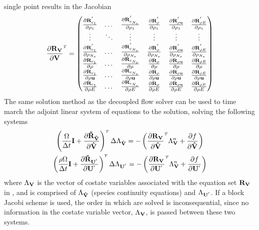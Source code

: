 single point results in the Jacobian
\begin{gather}
  \drvdv = 
  \begin{pmatrix}
    \tpdiff{\rho_1}{c_1}      & \dots  & \tpdiff{\rho_1}{c_{N_s}}     & \tpdiff{\rho_1}{\rho}     & \tpdiff{\rho_1}{\rho \vu}     &  \tpdiff{\rho_1}{\rho E}  \\
    \vdots                    & \ddots & \vdots                       & \vdots                    & \vdots                        & \vdots                    \\
    \tpdiff{\rho_{N_s}}{c_1}  & \dots  & \tpdiff{\rho_{N_s}}{c_{N_s}} & \tpdiff{\rho_{N_s}}{\rho} & \tpdiff{\rho_{N_s}}{\rho \vu} &  \tpdiff{\rho_{N_s}}{\rho E}    \\
    \tdiff{\rho}{c_1}         & \dots  & \tdiff{\rho}{c_{N_s}}        & \tdiff{\rho}{\rho}        & \tdiff{\rho}{\rho \vu}        &  \tdiff{\rho}{\rho E}     \\
    \tdiff{\rho \vu}{c_1}     & \dots  & \tdiff{\rho \vu}{c_{N_s}}    & \tdiff{\rho \vu}{\rho}    & \tdiff{\rho \vu}{\rho \vu}    &  \tdiff{\rho \vu}{\rho E} \\
    \tdiff{\rho E}{c_1}       & \dots  & \tdiff{\rho E}{c_{N_s}}      & \tdiff{\rho E}{\rho}      & \tdiff{\rho E}{\rho \vu}      &  \tdiff{\rho E}{\rho E}
  \end{pmatrix}
  \label{dc-full-system}
\end{gather}
The same solution method as the decoupled flow solver can be used to time march
the adjoint linear system of equations to the solution, solving the following
systems
\begin{gather}
  \left(
  \frac{\vol}{\Delta t} \mi + \pd{\mathbf{\tilde{R}_{\Vhat}}}{\Vhat}
  \right)^{\mathsmaller T} \Delta \adjlam{\Vhat}
  =
  -\left(\pd{\rv{}}{\Vhat}^{\mathsmaller T}\adjlam{\mv}^n + \pd{f}{\Vhat} \right)
  \label{dc-species-adj-time} \\
  \left(
  \frac{\rho \vol}{\Delta t} \mi + \pd{\mathbf{\tilde{R}_{\Up}}}{\Up}
  \right)^{\mathsmaller T} \Delta \adjlam{\Up}
  =
  -\left(\pd{\rv{}}{\Up}^{\mathsmaller T}\adjlam{\mv}^n + \pd{f}{\Up} \right)
  \label{dc-mixture-adj-time}
\end{gather}
where $\Lambda_{\mathbf V}$ is the vector of costate variables associated with the
equation set $\mathbf R_{{\mathbf V}_{}}$ in , and is comprised of $\Lambda_{\mathbf{\hat{V}}}$
(species continuity equations) and $\Lambda_{\mathbf{U}^{'}}$.  If a block Jacobi scheme is
used, the order in which  are
solved is inconsequential, since no information in the costate variable vector,
$\Lambda_{\mathbf V}$, is passed between these two systems.


